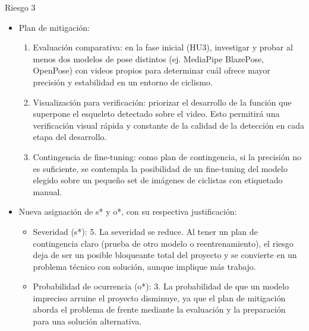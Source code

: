 \documentclass[
11pt, %
]{charter}
\begin{document}
Riesgo 3
\begin{itemize}
    \item Plan de mitigación:
    \begin{enumerate}
        \item Evaluación comparativa: en la fase inicial (HU3), investigar y probar al menos dos modelos de pose distintos (ej. MediaPipe BlazePose, OpenPose) con videos propios para determinar cuál ofrece mayor precisión y estabilidad en un entorno de ciclismo.
        \item Visualización para verificación: priorizar el desarrollo de la función que superpone el esqueleto detectado sobre el video. Esto permitirá una verificación visual rápida y constante de la calidad de la detección en cada etapa del desarrollo.
        \item Contingencia de fine-tuning: como plan de contingencia, si la precisión no es suficiente, se contempla la posibilidad de un fine-tuning del modelo elegido sobre un pequeño set de imágenes de ciclistas con etiquetado manual.
    \end{enumerate}
    \item Nueva asignación de s* y o*, con su respectiva justificación:
    \begin{itemize}
        \item Severidad (s*): 5. La severidad se reduce. Al tener un plan de contingencia claro (prueba de otro modelo o reentrenamiento), el riesgo deja de ser un posible bloqueante total del proyecto y se convierte en un problema técnico con solución, aunque implique más trabajo.
        \item Probabilidad de ocurrencia (o*): 3. La probabilidad de que un modelo impreciso arruine el proyecto disminuye, ya que el plan de mitigación aborda el problema de frente mediante la evaluación y la preparación para una solución alternativa.
    \end{itemize}
\end{itemize}
\end{document}
